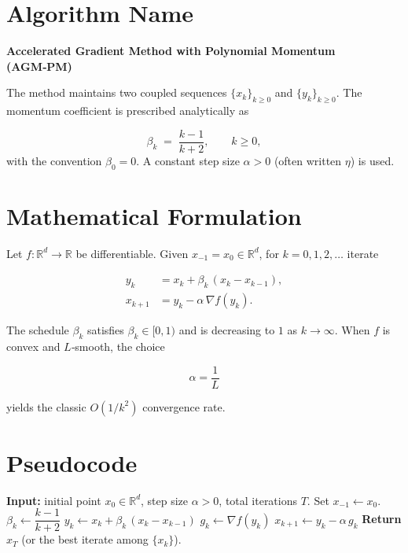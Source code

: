 \documentclass{article}
\newcommand{\R}{\mathbb{R}}
\begin{document}
\section*{Algorithm Name}
\textbf{Accelerated Gradient Method with Polynomial Momentum (AGM‑PM)}  

The method maintains two coupled sequences $\{x_k\}_{k\ge 0}$ and $\{y_k\}_{k\ge 0}$.
The momentum coefficient is prescribed analytically as  

\[
\beta_k \;=\; \frac{k-1}{k+2},\qquad k\ge 0,
\]
with the convention $\beta_0=0$.  
A constant step size $\alpha>0$ (often written $\eta$) is used.

\section*{Mathematical Formulation}
Let $f:\R^d\to\R$ be differentiable.  
Given $x_{-1}=x_0\in\R^d$, for $k=0,1,2,\dots$ iterate

\[
\boxed{
\begin{aligned}
y_k &= x_k + \beta_k\,(x_k-x_{k-1}), \tag{1}\\[4pt]
x_{k+1} &= y_k - \alpha\,\nabla f(y_k). \tag{2}
\end{aligned}}
\]

The schedule $\beta_k$ satisfies $\beta_k\in[0,1)$ and is decreasing to $1$ as $k\to\infty$.
When $f$ is convex and $L$‑smooth, the choice  

\[
\alpha = \frac{1}{L}
\]

yields the classic $O(1/k^{2})$ convergence rate.

\section*{Pseudocode}
\begin{algorithm}[H]
\caption{AGM‑PM}
\begin{algorithmic}[1]
\State \textbf{Input:} initial point $x_0\in\R^d$, step size $\alpha>0$, total iterations $T$.
\State Set $x_{-1}\gets x_0$.
    \State $\beta_k \gets \dfrac{k-1}{k+2}$ 
    \State $y_k \gets x_k + \beta_k\,(x_k-x_{k-1})$ 
    \State $g_k \gets \nabla f(y_k)$
    \State $x_{k+1} \gets y_k - \alpha\, g_k$ 
\EndFor
\State \textbf{Return} $x_T$ (or the best iterate among $\{x_k\}$).
\end{algorithmic}
\end{algorithm}
\end{document}
